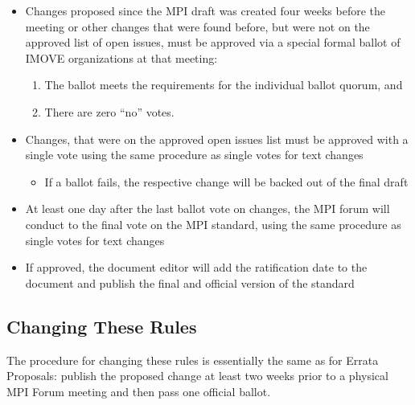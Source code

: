 \begin{enumerate}
\begin{enumerate}
\begin{itemize}
\item Changes proposed since the MPI draft was created four weeks before the meeting or other changes that were found before, but were not on the approved list of open issues, must be approved via a
    special formal ballot of IMOVE organizations at that meeting:
    \begin{enumerate}
    \item The ballot meets the requirements for the individual
      ballot quorum, and
    \item There are zero ``no'' votes.
    \end{enumerate}
\item Changes, that were on the approved open issues list must be approved with a single vote using the same procedure as single votes for text changes
\begin{itemize}
\item If a ballot fails, the respective change will be backed out of the final draft
\end{itemize}
\item At least one day after the last ballot vote on changes, the MPI forum will conduct to the final vote on the MPI standard, using the same procedure as single votes for text changes
\item If approved, the document editor will add the ratification date to the document and publish the final and official version of the standard
\end{itemize}

\end{enumerate}
 
\end{enumerate}


\subsection{Changing These Rules}

The procedure for changing these rules is essentially the same as for
Errata Proposals: publish the proposed change at least two weeks prior
to a physical MPI Forum meeting and then pass one official ballot.

{\color{red}{The new rules take effect as soon as they are
  approved/voted in by the MPI Forum.}}

